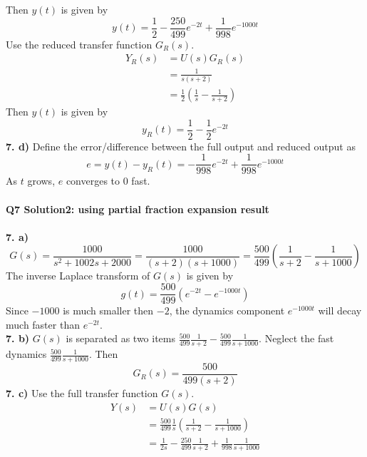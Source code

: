 \documentclass[11pt, a4paper]{article}
\begin{document}
Then $y(t)$ is given by
\begin{equation*}
y(t) = \frac{1}{2} - \frac{250}{499}e^{-2t} + \frac{1}{998}e^{-1000t}
\end{equation*}
Use the reduced transfer function $G_R(s)$. 
\begin{equation*}
\begin{split}
Y_R(s) &= U(s)G_R(s) \\
       &= \frac{1}{s(s+2)}\\
       &= \frac{1}{2}(\frac{1}{s}-\frac{1}{s+2})
\end{split}
\end{equation*}
Then $y(t)$ is given by
\begin{equation*}
y_R(t) = \frac{1}{2} - \frac{1}{2}e^{-2t}
\end{equation*}
\textbf{7. d)} Define the error/difference between the full output and reduced output as
\begin{equation*}
e = y(t) - y_R(t) = -\frac{1}{998}e^{-2t} + \frac{1}{998}e^{-1000t}
\end{equation*}
As $t$ grows, $e$ converges to 0 fast.\\
\\
\textbf{Q7 Solution2: using partial fraction expansion result}\\
\\
\textbf{7. a)}
\begin{equation*}
G(s) = \frac{1000}{s^2 + 1002s + 2000} = \frac{1000}{(s+2)(s+1000)} = \frac{500}{499}(\frac{1}{s+2} - \frac{1}{s+1000})
\end{equation*}
The inverse Laplace transform of $G(s)$ is given by
\begin{equation*}
g(t) = \frac{500}{499}(e^{-2t} - e^{-1000t})
\end{equation*}
Since $-1000$ is much smaller then $-2$, the dynamics component $e^{-1000t}$ will decay much faster than $e^{-2t}$.
\\
\textbf{7. b)} $G(s)$ is separated as two items $\frac{500}{499}\frac{1}{s+2}-\frac{500}{499}\frac{1}{s+1000}.$ Neglect
the fast dynamics $\frac{500}{499}\frac{1}{s+1000}.$ Then
\begin{equation*}
G_R(s) = \frac{500}{499(s+2)}
\end{equation*}
\textbf{7. c)} Use the full transfer function $G(s)$.
\begin{equation*}
\begin{split}
Y(s) &= U(s)G(s) \\
     &= \frac{500}{499}\frac{1}{s}(\frac{1}{s+2} - \frac{1}{s+1000})\\
     &= \frac{1}{2s} - \frac{250}{499}\frac{1}{s+2} + \frac{1}{998}\frac{1}{s+1000}
\end{split}
\end{equation*}
\end{document}
